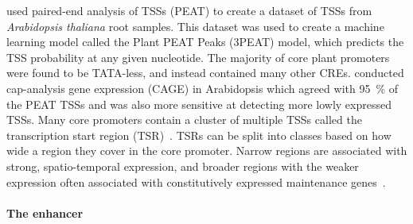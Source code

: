 \documentclass[../main.tex]{subfiles}
\begin{document}
\textcite*{mortonPairedEndAnalysisTranscription2014} used paired\hyp{}end analysis of TSSs (PEAT) to create a
dataset of TSSs from \textit{Arabidopsis thaliana} root samples. This
dataset was used to create a machine learning model called the Plant
PEAT Peaks (3PEAT) model, which predicts the TSS probability at any
given nucleotide. The majority of core plant promoters were found to be
TATA\hyp{}less, and instead contained many other CREs. \textcite*{thieffryCharacterizationArabidopsisThaliana2020} conducted cap\hyp{}analysis gene expression (CAGE) in Arabidopsis which agreed with \SI{95}{\percent} of the PEAT TSSs and was also more sensitive at
detecting more lowly expressed TSSs. Many core promoters contain a
cluster of multiple TSSs called the transcription start region (TSR)~\autocite{carninciGenomewideAnalysisMammalian2006,rachMotifCompositionConservation2009,niPairedendSequencingStrategy2010}. TSRs can be split into classes based on how wide a
region they cover in the core promoter. Narrow regions are associated
with strong, spatio\hyp{}temporal expression, and broader regions with the
weaker expression often associated with constitutively expressed
maintenance genes~\autocite{mortonPairedEndAnalysisTranscription2014}.

\paragraph{The enhancer}\label{chapter1:the-enhancer}
\end{document}
